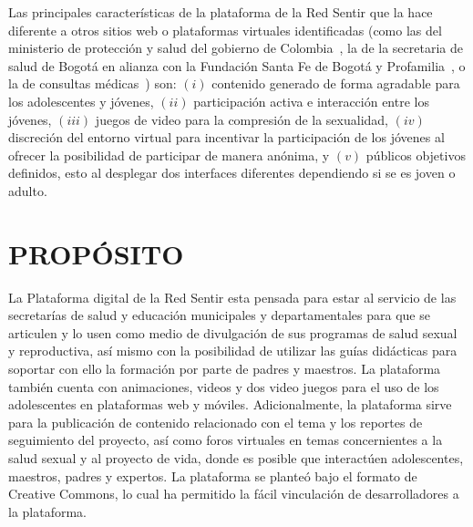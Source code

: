 \documentclass[journal,transmag]{IEEEtran}
\begin{document}
Las principales características de la plataforma de la Red Sentir que la hace diferente a otros sitios web o plataformas virtuales identificadas (como las del ministerio de protección y salud del gobierno de Colombia~\cite{PagGob2018}, la de la secretaria de salud de Bogotá en alianza con la Fundación Santa Fe de Bogotá y Profamilia~\cite{Sexperto2018}, o la de consultas médicas~\cite{1DOC3}) son: $(i)$ contenido generado de forma agradable para los adolescentes y jóvenes, $(ii)$ participación activa e interacción entre los jóvenes, $(iii)$ juegos de video para la compresión de la sexualidad, $(iv)$ discreción del entorno virtual para incentivar la participación de los jóvenes al ofrecer la posibilidad de participar de manera anónima, y $(v)$ públicos objetivos definidos, esto al desplegar dos interfaces diferentes dependiendo si se es joven o adulto.  


\section{PROPÓSITO}\label{sec:propositos}

La Plataforma digital de la Red Sentir esta pensada para estar al servicio de las secretarías de salud y educación municipales y departamentales para que se articulen y lo usen como medio de divulgación de sus programas de salud sexual y reproductiva, así mismo con la posibilidad de utilizar las guías didácticas para soportar con ello la formación por parte de padres y maestros. La plataforma también cuenta con animaciones, videos y dos video juegos para el uso de los adolescentes en plataformas web y móviles. Adicionalmente, la plataforma sirve para la publicación de contenido relacionado con el tema y los reportes de seguimiento del proyecto, así como foros virtuales en temas concernientes a la salud sexual y al proyecto de vida, donde es posible que interactúen adolescentes, maestros, padres y expertos. La plataforma se planteó bajo el formato de Creative Commons, lo cual ha permitido la fácil vinculación de desarrolladores a la plataforma.
\end{document}
